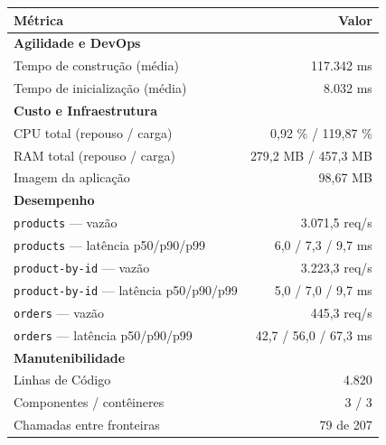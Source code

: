 \begin{quadro}[htb]
  \centering
  \caption{Métricas do sistema de e-commerce no baseline (Snapshot 0).}
  \label{qua:metricas-ecommerce-s0}
  \renewcommand{\arraystretch}{1.15}
  \begin{tabular}{|l|r|}
    \hline
    \textbf{Métrica} & \textbf{Valor} \\ \hline
    \multicolumn{2}{|l|}{\textbf{Agilidade e DevOps}} \\ \hline
    Tempo de construção (média) & 117.342 ms \\
    Tempo de inicialização (média) & 8.032 ms \\ \hline
    \multicolumn{2}{|l|}{\textbf{Custo e Infraestrutura}} \\ \hline
    CPU total (repouso / carga) & 0,92 \% / 119,87 \% \\
    RAM total (repouso / carga) & 279,2 MB / 457,3 MB \\
    Imagem da aplicação & 98,67 MB \\ \hline
    \multicolumn{2}{|l|}{\textbf{Desempenho}} \\ \hline
    \texttt{products} --- vazão & 3.071,5 req/s \\
    \texttt{products} --- latência p50/p90/p99 & 6,0 / 7,3 / 9,7 ms \\
    \texttt{product-by-id} --- vazão & 3.223,3 req/s \\
    \texttt{product-by-id} --- latência p50/p90/p99 & 5,0 / 7,0 / 9,7 ms \\
    \texttt{orders} --- vazão & 445,3 req/s \\
    \texttt{orders} --- latência p50/p90/p99 & 42,7 / 56,0 / 67,3 ms \\ \hline
    \multicolumn{2}{|l|}{\textbf{Manutenibilidade}} \\ \hline
    Linhas de Código & 4.820 \\
    Componentes / contêineres & 3 / 3 \\
    Chamadas entre fronteiras & 79 de 207 \\ \hline
  \end{tabular}
\end{quadro}
